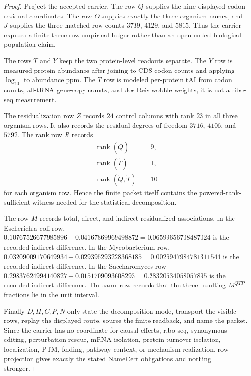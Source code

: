 \begin{proof}
Project the accepted carrier. The row $Q$ supplies the nine displayed codon-residual coordinates. The row $O$ supplies exactly the three organism names, and $J$ supplies the three matched row counts $3739$, $4129$, and $5815$. Thus the carrier exposes a finite three-row empirical ledger rather than an open-ended biological population claim.

The rows $T$ and $Y$ keep the two protein-level readouts separate. The $Y$ row is measured protein abundance after joining to CDS codon counts and applying $\log_{10}$ to abundance ppm. The $T$ row is modeled per-protein tAI from codon counts, all-tRNA gene-copy counts, and dos Reis wobble weights; it is not a ribo-seq measurement.

The residualization row $Z$ records $24$ control columns with rank $23$ in all three organism rows. It also records the residual degrees of freedom $3716$, $4106$, and $5792$. The rank row $R$ records
$$
\begin{aligned}
\operatorname{rank}(\widetilde Q) &= 9,\\
\operatorname{rank}(\widetilde T) &= 1,\\
\operatorname{rank}(\widetilde Q,\widetilde T) &= 10
\end{aligned}
$$
for each organism row. Hence the finite packet itself contains the powered-rank-sufficient witness needed for the statistical decomposition.

The row $M$ records total, direct, and indirect residualized associations. In the Escherichia coli row, $0.10767526677985896-0.04167869969498872=0.06599656708487024$ is the recorded indirect difference. In the Mycobacterium row, $0.03209009170649934-0.029395293228368185=0.0026947984781311544$ is the recorded indirect difference. In the Saccharomyces row, $0.29837624994140827-0.0151709093608293=0.28320534058057895$ is the recorded indirect difference. The same row records that the three resulting $M^{QTP}$ fractions lie in the unit interval.

Finally $D,H,C,P,N$ only state the decomposition mode, transport the visible rows, replay the displayed route, source the finite readback, and name the packet. Since the carrier has no coordinate for causal effects, ribo-seq, synonymous editing, perturbation rescue, mRNA isolation, protein-turnover isolation, localization, PTM, folding, pathway context, or mechanism realization, row projection gives exactly the stated NameCert obligations and nothing stronger.
\end{proof}

